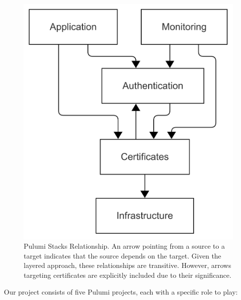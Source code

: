 \begin{figure}[h]
    \centering
    \includegraphics[width=.45\textwidth]{images/pulumi_stacks.png}
    \caption{Pulumi Stacks Relationship. An arrow pointing from a source to a target indicates that the source depends on the target. Given the layered approach, these relationships are transitive. However, arrows targeting certificates are explicitly included due to their significance.}
    \label{fig:pulumi_stacks}
\end{figure}

Our project consists of five Pulumi projects, each with a specific role to play:

